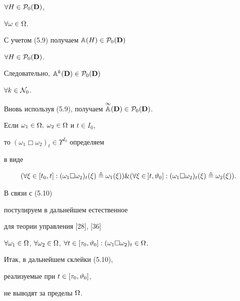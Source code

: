 $\forall{H} \in {{\cal P}_0}({\bold D})$,


$\forall{\omega} \in \Omega$.


С учетом (5.9) получаем ${{\Bbb A}(H)} \in {{\cal P}_0}({\bold D})$


$\forall{H} \in {{\cal P}_0}({\bold D})$.


Следовательно, ${{\Bbb A}^k}({\bold D}) \in {{\cal P}_0}({\bold D})$


$\forall{k} \in {{\cal N}_0}$.


Вновь используя (5.9), получаем $\up{\infty}{\Bbb A}({\bold D})


\in{{\cal P}_0}({\bold D})$.





Если ${{\omega}_1} \in \Omega,\;{{\omega}_2} \in \Omega$ и $t \in {I_0}$,


то ${({{\omega}_1}\Box{{\omega}_2})_t} \in {\Upsilon}^{I_0}$ определяем


в виде


\begin{equation}


(\fo{\xi} \in [{t_0},t]:{({{\omega}_1}\Box{{\omega}_2})_t}(\xi) \stac


{{\omega}_1}(\xi)) \& (\fo{\xi} \in\, ]t,{{\vt}_0}]:


{({{\omega}_1}\Box{{\omega}_2})_t}(\xi) \stac {{\omega}_2}(\xi)).


\end{equation}


В связи с (5.10)


постулируем в дальнейшем естественное


для теории управления [28], [36]


\pagebreak





\begin{conds}


$\fo{{\omega}_1} \in \Om$, $\fo{{\omega}_2} \in \Om$, $\fo{t} \in


[{{\tau}_0},{{\vt}_0}]:{({{\omega}_1}\Box{{\omega}_2})_t} \in \Om$.


\end{conds}





Итак, в дальнейшем склейки (5.10),


реализуемые при $t \in [{{\tau}_0},{{\vartheta}_0}]$,


не выводят за пределы $\Omega$.


